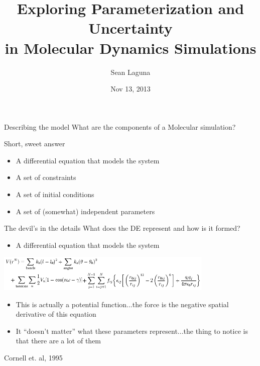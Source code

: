 \documentclass{beamer}
\title[Parameterization and Uncertainty in MD Simulations]
      {Exploring Parameterization and Uncertainty \\
       in Molecular Dynamics Simulations}
\author{Sean Laguna}
\institute{University of Chicago}
\date{Nov 13, 2013}
\begin{document}
\begin{frame}
\titlepage
\end{frame}


\begin{frame}{Describing the model}
What are the components of a Molecular simulation?
\end{frame}

\begin{frame}{Short, sweet answer}
\begin{itemize}
    \item A differential equation that models the system
    \item A set of constraints
    \item A set of initial conditions 
    \item A set of (somewhat) independent parameters
\end{itemize}
\end{frame}


\begin{frame}{The devil's in the details}
What does the DE represent and how is it formed?
\begin{itemize}
    \item A differential equation that models the system
\end{itemize}
\begin{center}
\includegraphics[width=0.78\textwidth]{images/AMBER}
\end{center}
\begin{itemize}
    \item This is actually a potential function...the force is the negative
        spatial derivative of this equation
    \item It ``doesn't matter'' what these parameters represent...the thing to
        notice is that there are a lot of them
\end{itemize}
{\footnotesize Cornell et. al, 1995}
\end{frame}

\end{document}
